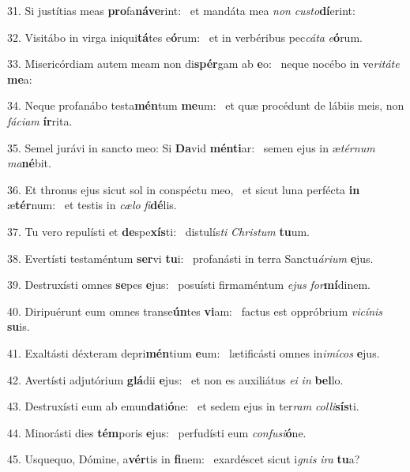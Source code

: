 31. Si justítias meas \textbf{pro}fa\textbf{ná}\textbf{ve}rint: \ast\  et mandáta mea \textit{non} \textit{cus}\textit{to}\textbf{dí}erint:\

32. Visitábo in virga iniqui\textbf{tá}tes e\textbf{ó}rum: \ast\  et in verbéribus pec\textit{cá}\textit{ta} \textit{e}\textbf{ó}rum.\

33. Misericórdiam autem meam non di\textbf{spér}gam ab \textbf{e}o: \ast\  neque nocébo in ve\textit{ri}\textit{tá}\textit{te} \textbf{me}a:\

34. Neque profanábo testa\textbf{mén}tum \textbf{me}um: \ast\  et quæ procédunt de lábiis meis, non \textit{fá}\textit{ci}\textit{am} \textbf{ír}rita.\

35. Semel jurávi in sancto meo: Si \textbf{Da}vid \textbf{mén}\textbf{ti}ar: \ast\  semen ejus in æ\textit{tér}\textit{num} \textit{ma}\textbf{né}bit.\

36. Et thronus ejus sicut sol in conspéctu meo, \dag\  et sicut luna perfécta \textbf{in} æ\textbf{tér}num: \ast\  et testis in \textit{cæ}\textit{lo} \textit{fi}\textbf{dé}lis.\

37. Tu vero repulísti et \textbf{de}spe\textbf{xís}ti: \ast\  distulís\textit{ti} \textit{Chris}\textit{tum} \textbf{tu}um.\

38. Evertísti testaméntum \textbf{ser}vi \textbf{tu}i: \ast\  profanásti in terra Sanctu\textit{á}\textit{ri}\textit{um} \textbf{e}jus.\

39. Destruxísti omnes \textbf{se}pes \textbf{e}jus: \ast\  posuísti firmaméntum \textit{e}\textit{jus} \textit{for}\textbf{mí}dinem.\

40. Diripuérunt eum omnes transe\textbf{ún}tes \textbf{vi}am: \ast\  factus est oppróbrium \textit{vi}\textit{cí}\textit{nis} \textbf{su}is.\

41. Exaltásti déxteram depri\textbf{mén}tium \textbf{e}um: \ast\  lætificásti omnes in\textit{i}\textit{mí}\textit{cos} \textbf{e}jus.\

42. Avertísti adjutórium \textbf{glá}dii \textbf{e}jus: \ast\  et non es auxiliátus \textit{e}\textit{i} \textit{in} \textbf{bel}lo.\

43. Destruxísti eum ab emun\textbf{da}ti\textbf{ó}ne: \ast\  et sedem ejus in ter\textit{ram} \textit{col}\textit{li}\textbf{sís}ti.\

44. Minorásti dies \textbf{tém}poris \textbf{e}jus: \ast\  perfudísti eum \textit{con}\textit{fu}\textit{si}\textbf{ó}ne.\

45. Usquequo, Dómine, a\textbf{vér}tis in \textbf{fi}nem: \ast\  exardéscet sicut i\textit{gnis} \textit{i}\textit{ra} \textbf{tu}a?\

